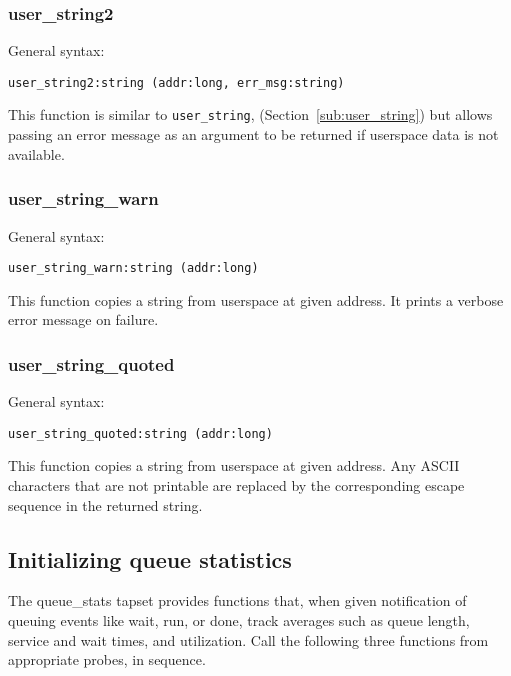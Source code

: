 \documentclass[twoside,english]{article}
\newenvironment{vindent}
{\begin{list}{}{\setlength{\listparindent}{6pt}}
\item[]}
{\end{list}}
\begin{document}
\subsubsection{user\_string2}
General syntax:

\begin{vindent}
\begin{verbatim}
user_string2:string (addr:long, err_msg:string)
\end{verbatim}
\end{vindent}
This function is similar to \texttt{user\_string}, (Section~\ref{sub:user_string})
but allows passing an error message as an argument to be returned if userspace
data is not available.


\subsubsection{user\_string\_warn}
General syntax:

\begin{vindent}
\begin{verbatim}
user_string_warn:string (addr:long)
\end{verbatim}
\end{vindent}
This function copies a string from userspace at given address. It prints
a verbose error message on failure.


\subsubsection{user\_string\_quoted}
General syntax:

\begin{vindent}
\begin{verbatim}
user_string_quoted:string (addr:long)
\end{verbatim}
\end{vindent}
This function copies a string from userspace at given address. Any ASCII
characters that are not printable are replaced by the corresponding escape
sequence in the returned string.


\subsection{Initializing queue statistics}
The queue\_stats tapset provides functions that, when given notification
of queuing events like wait, run, or done, track averages such as queue length,
service and wait times, and utilization. Call the following three functions
from appropriate probes, in sequence.
\end{document}
